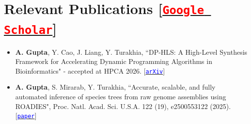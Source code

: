 \documentclass[letterpaper,11pt]{article}
\newcommand{\resumeSubHeadingListStart}{\begin{itemize}[leftmargin=0.0in, label={}]}
\newcommand{\resumeSubHeadingListEnd}{\end{itemize}}
\begin{document}
 



\section{Relevant Publications [\href{https://scholar.google.com/citations?user=vRrKCdwAAAAJ&hl=en}{\textcolor{red}{\texttt{Google Scholar}}}]}
\begin{itemize}[leftmargin=0.1in]
    \item \textbf{A. Gupta}, Y. Cao, J. Liang, Y. Turakhia, “DP-HLS: A High-Level Synthesis Framework for Accelerating Dynamic Programming Algorithms in Bioinformatics" - accepted at HPCA 2026. [\href{https://arxiv.org/abs/2411.03398}{\textcolor{blue}{\texttt{arXiv}}}]
    \item \textbf{A. Gupta}, S. Mirarab, Y. Turakhia, “Accurate, scalable, and fully automated inference of species trees from raw genome assemblies using ROADIES", Proc. Natl. Acad. Sci. U.S.A. 122 (19), e2500553122 (2025). [\href{https://doi.org/10.1073/pnas.2500553122}{\textcolor{blue}{\texttt{paper}}}]
\end{itemize}
\end{document}
